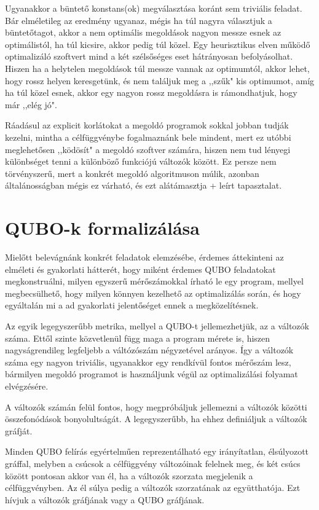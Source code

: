 Ugyanakkor a büntető konstans(ok) megválasztása koránt sem triviális feladat. Bár elméletileg az eredmény ugyanaz, mégis ha túl nagyra választjuk a büntetőtagot, akkor a nem optimális megoldások nagyon messze esnek az optimálistól, ha túl kicsire, akkor pedig túl közel. Egy heurisztikus elven működő optimalizáló szoftvert mind a két szélsőséges eset hátrányosan befolyásolhat. Hiszen ha a helytelen megoldások túl messze vannak az optimumtól, akkor lehet, hogy rossz helyen keresgetünk, és nem találjuk meg a ,,szűk" kis optimumot, amíg ha túl közel esnek, akkor egy nagyon rossz megoldásra is rámondhatjuk, hogy már ,,elég jó".

Ráadásul az explicit korlátokat a megoldó programok sokkal jobban tudják kezelni, mintha a célfüggvénybe fogalmaznánk bele mindent, mert ez utóbbi meglehetősen ,,ködösít" a megoldó szoftver számára, hiszen nem tud lényegi különbséget tenni a különböző funkciójú változók között. Ez persze nem törvényszerű, mert a konkrét megoldó algoritmuson múlik, azonban általánosságban mégis ez várható, és ezt alátámasztja \az+ leírt tapasztalat.

\section{QUBO-k formalizálása}\label{sec:QUBOform}

Mielőtt belevágnánk konkrét feladatok elemzésébe, érdemes áttekinteni az elméleti és gyakorlati hátterét, hogy miként érdemes QUBO feladatokat megkonstruálni, milyen egyszerű mérőszámokkal írható le egy program, mellyel megbecsülhető, hogy milyen könnyen kezelhető az optimalizálás során, és hogy egyáltalán mi a ad gyakorlati jelentőséget ennek a megközelítésnek.

Az egyik legegyszerűbb metrika, mellyel a QUBO-t jellemezhetjük, az a változók száma. Ettől szinte közvetlenül függ maga a program mérete is, hiszen nagyságrendileg legfeljebb a váltózószám négyzetével arányos. Így a változók száma egy nagyon triviális, ugyanakkor egy rendkívül fontos mérőszám lesz, bármilyen megoldó programot is használjunk végül az optimalizálási folyamat elvégzésére.

A változók számán felül fontos, hogy megpróbáljuk jellemezni a változók közötti összefonódások bonyolultságát. A legegyszerűbb, ha ehhez definiáljuk a változók gráfját.

\begin{definition}\label{def:valtozokgrafja}
	Minden QUBO felírás egyértelműen reprezentálható egy irányítatlan, élsúlyozott gráffal, melyben a csúcsok a célfüggvény változóinak felelnek meg, és két csúcs között pontosan akkor van él, ha a változók szorzata megjelenik a célfüggvényben. Az él súlya pedig a változók szorzatának az együtthatója. Ezt hívjuk a változók gráfjának vagy a QUBO gráfjának.
\end{definition}

